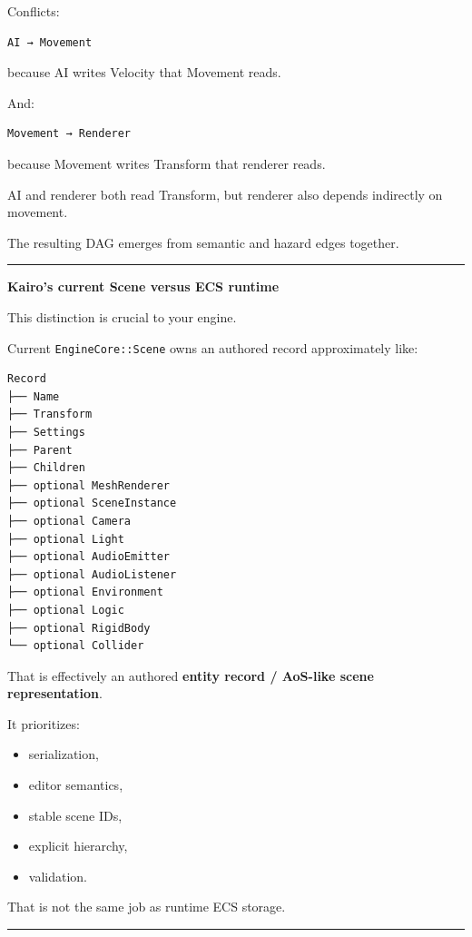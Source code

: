 Conflicts:

\begin{verbatim}
AI → Movement
\end{verbatim}

because AI writes Velocity that Movement reads.

And:

\begin{verbatim}
Movement → Renderer
\end{verbatim}

because Movement writes Transform that renderer reads.

AI and renderer both read Transform, but renderer also depends indirectly on movement.

The resulting DAG emerges from semantic and hazard edges together.

\begin{center}\rule{0.5\linewidth}{0.5pt}\end{center}

\textbf{Kairo's current Scene versus ECS runtime}

This distinction is crucial to your engine.

Current \texttt{EngineCore::Scene} owns an authored record approximately like:

\begin{verbatim}
Record
├── Name
├── Transform
├── Settings
├── Parent
├── Children
├── optional MeshRenderer
├── optional SceneInstance
├── optional Camera
├── optional Light
├── optional AudioEmitter
├── optional AudioListener
├── optional Environment
├── optional Logic
├── optional RigidBody
└── optional Collider
\end{verbatim}

That is effectively an authored \textbf{entity record / AoS-like scene representation}.

It prioritizes:

\begin{itemize}
\tightlist
\item
  serialization,
\item
  editor semantics,
\item
  stable scene IDs,
\item
  explicit hierarchy,
\item
  validation.
\end{itemize}

That is not the same job as runtime ECS storage.

\begin{center}\rule{0.5\linewidth}{0.5pt}\end{center}

